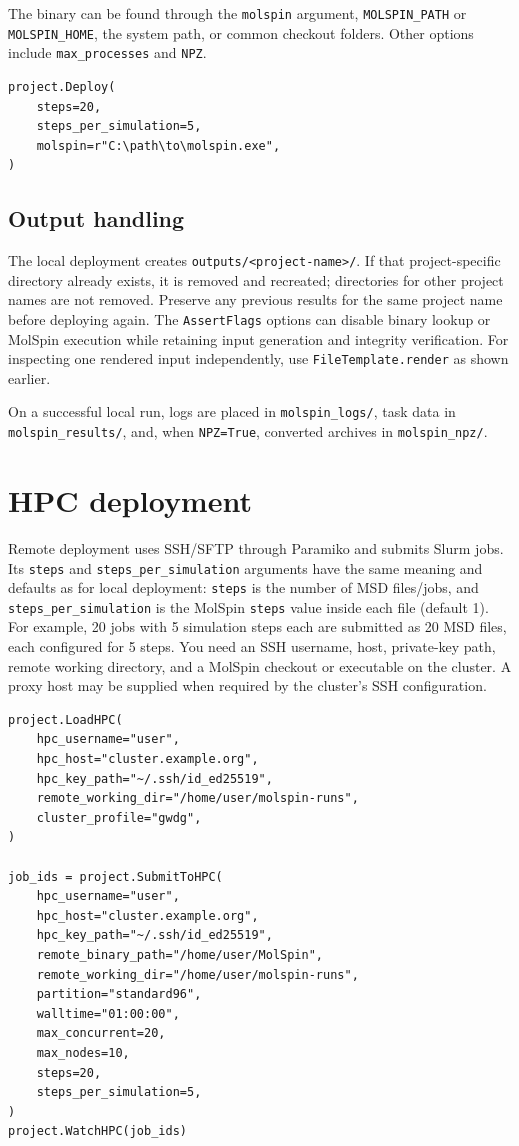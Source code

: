 \documentclass[11pt,a4paper]{article}
\begin{document}
The binary can be found through the \texttt{molspin} argument,
\texttt{MOLSPIN\_PATH} or \texttt{MOLSPIN\_HOME}, the system path, or common
checkout folders. Other options include \texttt{max\_processes} and
\texttt{NPZ}.

\begin{lstlisting}
project.Deploy(
    steps=20,
    steps_per_simulation=5,
    molspin=r"C:\path\to\molspin.exe",
)
\end{lstlisting}

\subsection{Output handling}

The local deployment creates \texttt{outputs/<project-name>/}. If that
project-specific directory already exists, it is removed and recreated;
directories for other project names are not removed. Preserve any previous
results for the same project name before deploying again. The
\texttt{AssertFlags} options can disable binary lookup or MolSpin execution
while retaining input generation and integrity verification. For inspecting
one rendered input independently, use \texttt{FileTemplate.render} as shown
earlier.

On a successful local run, logs are placed in
\texttt{molspin\_logs/}, task data in \texttt{molspin\_results/}, and, when
\texttt{NPZ=True}, converted archives in \texttt{molspin\_npz/}.

\section{HPC deployment}

Remote deployment uses SSH/SFTP through Paramiko and submits Slurm jobs. Its
\texttt{steps} and \texttt{steps\_per\_simulation} arguments have the same
meaning and defaults as for local deployment: \texttt{steps} is the number
of MSD files/jobs, and \texttt{steps\_per\_simulation} is the MolSpin
\texttt{steps} value inside each file (default 1). For example, 20 jobs with
5 simulation steps each are submitted as 20 MSD files, each configured for
5 steps. You need an SSH username, host, private-key path, remote working
directory, and a MolSpin checkout or executable on the cluster. A proxy host
may be supplied when required by the cluster's SSH configuration.

\begin{lstlisting}
project.LoadHPC(
    hpc_username="user",
    hpc_host="cluster.example.org",
    hpc_key_path="~/.ssh/id_ed25519",
    remote_working_dir="/home/user/molspin-runs",
    cluster_profile="gwdg",
)

job_ids = project.SubmitToHPC(
    hpc_username="user",
    hpc_host="cluster.example.org",
    hpc_key_path="~/.ssh/id_ed25519",
    remote_binary_path="/home/user/MolSpin",
    remote_working_dir="/home/user/molspin-runs",
    partition="standard96",
    walltime="01:00:00",
    max_concurrent=20,
    max_nodes=10,
    steps=20,
    steps_per_simulation=5,
)
project.WatchHPC(job_ids)
\end{lstlisting}
\end{document}
